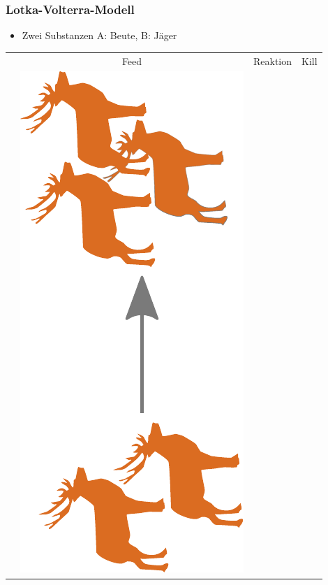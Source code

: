 \documentclass[12pt]{beamer}
\begin{document}
    \begin{frame}
      \frametitle{Lotka-Volterra-Modell}
      \begin{itemize}
      \item Zwei Substanzen A: Beute, B: Jäger
      \end{itemize}
      \renewcommand{\arraystretch}{0.1}
      \setlength{\tabcolsep}{0.2em} %
      \begin{tabular}{ r c c c }
	  & Feed & Reaktion & Kill \\
	  &
      \includegraphics[scale=0.12,angle=-90]{Bilder/lv_feed.pdf}
	  &

\end{tabular}
\end{frame}
\end{document}
